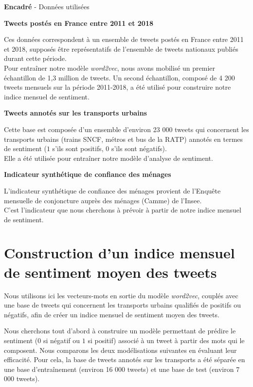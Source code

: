 \documentclass[10pt,french,french]{article}
\newcounter{comptEncadre}
\renewcommand\thecomptEncadre{%
\arabic{comptEncadre}}
\newenvironment{encadre}[2][false]{\refstepcounter{comptEncadre}
\begin{bclogo}[couleur=processblue!5,arrondi=0.1,
logo=\bcloupe,barre=none,couleurBord=blue!60!green,nobreak = #1]{ {\sc \textbf{Encadré \thecomptEncadre}} -  #2}
\smallskip
}{\end{bclogo}}
\begin{document}
\begin{encadre}[true]{Données utilisées}\label{enc:encadre1}

\small

\textbf{Tweets postés en France entre 2011 et 2018}

Ces données correspondent à un ensemble de tweets postés en France entre 2011 et 2018, supposés être représentatifs de l'ensemble de tweets nationaux publiés durant cette période. \\
Pour entraîner notre modèle \emph{word2vec}, nous avons mobilisé un premier échantillon de 1,3 million de tweets. Un second échantillon, composé de 4 200 tweets mensuels sur la période 2011-2018, a été utilisé pour construire notre indice mensuel de sentiment. 

\textbf{Tweets annotés sur les transports urbains}

Cette base est composée d'un ensemble d'environ 23 000 tweets qui concernent les transports urbains (trains SNCF, métros et bus de la RATP) annotés en termes de sentiment ($1$ s'ils sont positifs, $0$ s'ils sont négatifs).\\
Elle a été utilisée pour entraîner notre modèle d'analyse de sentiment.

\textbf{Indicateur synthétique de confiance des ménages}

L’indicateur synthétique de confiance des ménages provient de l'Enquête mensuelle de conjoncture auprès des ménages (Camme) de l’Insee.\\
C'est l'indicateur que nous cherchons à prévoir à partir de notre indice mensuel de sentiment.

\end{encadre}

\newpage

\section{Construction d'un indice mensuel de sentiment moyen des
tweets}\label{sec:sentimentalAnalysis}

Nous utilisons ici les vecteurs-mots en sortie du modèle
\emph{word2vec}, couplés avec une base de tweets qui concernent les
transports urbains qualifiés de positifs ou négatifs, afin de créer un
indice mensuel de sentiment moyen des tweets.

Nous cherchons tout d'abord à construire un modèle permettant de prédire
le sentiment (\(0\) si négatif ou \(1\) si positif) associé à un tweet à
partir des mots qui le composent. Nous comparons les deux modélisations
suivantes en évaluant leur efficacité. Pour cela, la base de tweets
annotés sur les transports a été séparée en une base d'entraînement
(environ 16 000 tweets) et une base de test (environ 7 000 tweets).
\end{document}
